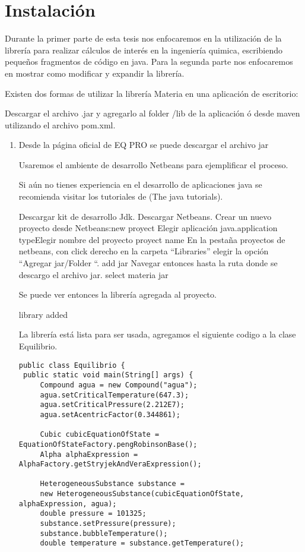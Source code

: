 \chapter{Instalación}
	Durante la primer parte de esta tesis nos enfocaremos en la utilización de la librería para realizar cálculos de interés en la ingeniería quimica, escribiendo pequeños fragmentos de código en java. Para la segunda parte nos enfocaremos en mostrar como modificar y expandir la librería.


	Existen dos formas de utilizar la librería Materia en una aplicación de escritorio:

    Descargar el archivo .jar y agregarlo al folder /lib de la aplicación ó desde maven utilizando el archivo pom.xml.

\begin{enumerate}
\item Desde la página oficial de EQ PRO se puede descargar el archivo jar

Usaremos el ambiente de desarrollo Netbeans para ejemplificar el proceso.

Si aún no tienes experiencia en el desarrollo de aplicaciones java se recomienda visitar los tutoriales de (The java tutorials).

    Descargar kit de desarrollo Jdk.
    Descargar Netbeans.
    Crear un nuevo proyecto desde Netbeans:new proyect Elegir aplicación java.application typeElegir nombre del proyecto proyect name
    En la pestaña proyectos de netbeans, con click derecho en la carpeta “Libraries” elegir la opción “Agregar jar/Folder “. add jar Navegar entonces hasta la ruta donde se descargo el archivo jar. select materia jar

Se puede ver entonces la librería agregada al proyecto.

library added

La librería está lista para ser usada, agregamos el siguiente codigo a la clase Equilibrio.


\begin{lstlisting}	
public class Equilibrio {
 public static void main(String[] args) {
	 Compound agua = new Compound("agua");
	 agua.setCriticalTemperature(647.3);
	 agua.setCriticalPressure(2.212E7);
	 agua.setAcentricFactor(0.344861);
	 
	 Cubic cubicEquationOfState = EquationOfStateFactory.pengRobinsonBase();
	 Alpha alphaExpression = AlphaFactory.getStryjekAndVeraExpression();
	 
	 HeterogeneousSubstance substance =
	 new HeterogeneousSubstance(cubicEquationOfState, alphaExpression, agua);
	 double pressure = 101325;
	 substance.setPressure(pressure);
	 substance.bubbleTemperature();
	 double temperature = substance.getTemperature();
	 

\end{lstlisting}
\end{enumerate}
